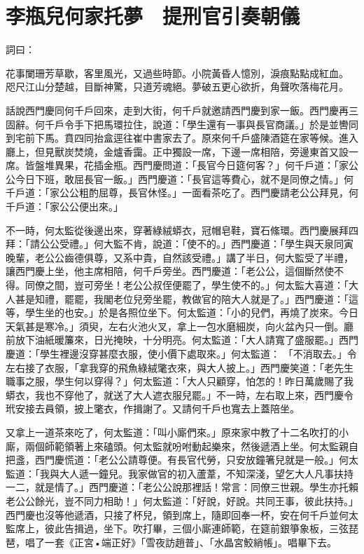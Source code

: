 %

\chapter{李瓶兒何家托夢　提刑官引奏朝儀}

詞曰：

花事闌珊芳草歇，客里風光，又過些時節。小院黃昏人憶別，淚痕點點成紅血。
咫尺江山分楚越，目斷神驚，只道芳魂絕。夢破五更心欲折，角聲吹落梅花月。

話說西門慶同何千戶回來，走到大街，何千戶就邀請西門慶到家一飯。西門慶再三固辭。何千戶令手下把馬環拉住，說道：「學生還有一事與長官商議。」於是並轡同到宅前下馬。賁四同抬盒逕往崔中書家去了。原來何千戶盛陳酒筵在家等候。進入廳上，但見獸炭焚燒，金爐香靄。正中獨設一席，下邊一席相陪，旁邊東首又設一席。皆盤堆異果，花插金瓶。西門慶問道：「長官今日筵何客？」何千戶道：「家公公今日下班，敢屈長官一飯。」西門慶道：「長官這等費心，就不是同僚之情。」何千戶道：「家公公粗酌屈尊，長官休怪。」一面看茶吃了。西門慶請老公公拜見，何千戶道：「家公公便出來。」

不一時，何太監從後邊出來，穿著綠絨蟒衣，冠帽皂鞋，寶石絛環。西門慶展拜四拜：「請公公受禮。」何大監不肯，說道：「使不的。」西門慶道：「學生與天泉同寅晚輩，老公公齒德俱尊，又系中貴，自然該受禮。」講了半日，何大監受了半禮，讓西門慶上坐，他主席相陪，何千戶旁坐。西門慶道：「老公公，這個斷然使不得。同僚之間，豈可旁坐！老公公叔侄便罷了，學生使不的。」何太監大喜道：「大人甚是知禮，罷罷，我閣老位兒旁坐罷，教做官的陪大人就是了。」西門慶道：「這等，學生坐的也安。」於是各照位坐下。何太監道：「小的兒們，再燒了炭來。今日天氣甚是寒冷。」須臾，左右火池火叉，拿上一包水磨細炭，向火盆內只一倒。廳前放下油紙暖簾來，日光掩映，十分明亮。何太監道：「大人請寬了盛服罷。」西門慶道：「學生裡邊沒穿甚麼衣服，使小價下處取來。」何太監道： 「不消取去。」令左右接了衣服，「拿我穿的飛魚綠絨氅衣來，與大人披上。」西門慶笑道：「老先生職事之服，學生何以穿得？」何太監道：「大人只顧穿，怕怎的！昨日萬歲賜了我蟒衣，我也不穿他了，就送了大人遮衣服兒罷。」不一時，左右取上來，西門慶令玳安接去員領，披上氅衣，作揖謝了。又請何千戶也寬去上蓋陪坐。

又拿上一道茶來吃了，何太監道：「叫小廝們來。」原來家中教了十二名吹打的小廝，兩個師範領著上來磕頭。何太監就吩咐動起樂來，然後遞酒上坐。何太監親自把盞，西門慶慌道：「老公公請尊便。有長官代勞，只安放鐘箸兒就是一般。」何太監道：「我與大人遞一鐘兒。我家做官的初入蘆葦，不知深淺，望乞大人凡事扶持一二，就是情了。」西門慶道：「老公公說那裡話！常言：同僚三世親。學生亦托賴老公公餘光，豈不同力相助！」何太監道：「好說，好說。共同王事，彼此扶持。」西門慶也沒等他遞酒，只接了杯兒，領到席上，隨即回奉一杯，安在何千戶並何太監席上，彼此告揖過，坐下。吹打畢，三個小廝連師範，在筵前銀箏象板，三弦琵琶，唱了一套《正宮•端正好》「雪夜訪趙普」、「水晶宮鮫綃帳」。唱畢下去。

